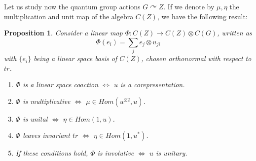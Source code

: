 \documentclass[12pt]{amsbook}
\newtheorem{proposition}[theorem]{Proposition}
\begin{document}
\smallskip

Let us study now the quantum group actions $G\curvearrowright Z$. If we denote by $\mu,\eta$ the multiplication and unit map of the algebra $C(Z)$, we have the following result:

\begin{proposition}
Consider a linear map $\Phi:C(Z)\to C(Z)\otimes C(G)$, written as
$$\Phi(e_i)=\sum_je_j\otimes u_{ji}$$
with $\{e_i\}$ being a linear space basis of $C(Z)$, chosen orthonormal with respect to $tr$.
\begin{enumerate}
\item $\Phi$ is a linear space coaction $\iff$ $u$ is a corepresentation.

\item $\Phi$ is multiplicative $\iff$ $\mu\in Hom(u^{\otimes 2},u)$.

\item $\Phi$ is unital $\iff$ $\eta\in Hom(1,u)$.

\item $\Phi$ leaves invariant $tr$ $\iff$ $\eta\in Hom(1,u^*)$.

\item If these conditions hold, $\Phi$ is involutive $\iff$ $u$ is unitary.
\end{enumerate}
\end{proposition}
\end{document}
